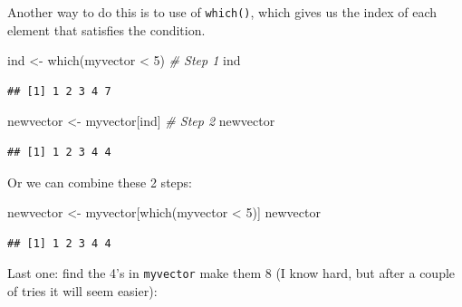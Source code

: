 \documentclass[
]{book}
\newenvironment{Shaded}{\begin{snugshade}}{\end{snugshade}}
\newcommand{\CommentTok}[1]{\textcolor[rgb]{0.56,0.35,0.01}{\textit{#1}}}
\newcommand{\DecValTok}[1]{\textcolor[rgb]{0.00,0.00,0.81}{#1}}
\newcommand{\FunctionTok}[1]{\textcolor[rgb]{0.00,0.00,0.00}{#1}}
\newcommand{\NormalTok}[1]{#1}
\newcommand{\OtherTok}[1]{\textcolor[rgb]{0.56,0.35,0.01}{#1}}
\newcommand{\SpecialCharTok}[1]{\textcolor[rgb]{0.00,0.00,0.00}{#1}}
\theoremstyle{definition}
\theoremstyle{definition}
\theoremstyle{definition}
\theoremstyle{definition}
\theoremstyle{remark}
\begin{document}
Another way to do this is to use of \texttt{which()}, which gives us the index of each element that satisfies the condition.

\begin{Shaded}
\begin{Highlighting}[]
\NormalTok{ind }\OtherTok{\textless{}{-}} \FunctionTok{which}\NormalTok{(myvector }\SpecialCharTok{\textless{}} \DecValTok{5}\NormalTok{)  }\CommentTok{\# Step 1}
\NormalTok{ind}
\end{Highlighting}
\end{Shaded}

\begin{verbatim}
## [1] 1 2 3 4 7
\end{verbatim}

\begin{Shaded}
\begin{Highlighting}[]
\NormalTok{newvector }\OtherTok{\textless{}{-}}\NormalTok{ myvector[ind]  }\CommentTok{\# Step 2}
\NormalTok{newvector}
\end{Highlighting}
\end{Shaded}

\begin{verbatim}
## [1] 1 2 3 4 4
\end{verbatim}

Or we can combine these 2 steps:

\begin{Shaded}
\begin{Highlighting}[]
\NormalTok{newvector }\OtherTok{\textless{}{-}}\NormalTok{ myvector[}\FunctionTok{which}\NormalTok{(myvector }\SpecialCharTok{\textless{}} \DecValTok{5}\NormalTok{)]}
\NormalTok{newvector}
\end{Highlighting}
\end{Shaded}

\begin{verbatim}
## [1] 1 2 3 4 4
\end{verbatim}

Last one: find the 4's in \texttt{myvector} make them 8 (I know hard, but after a couple of tries it will seem easier):
\end{document}
